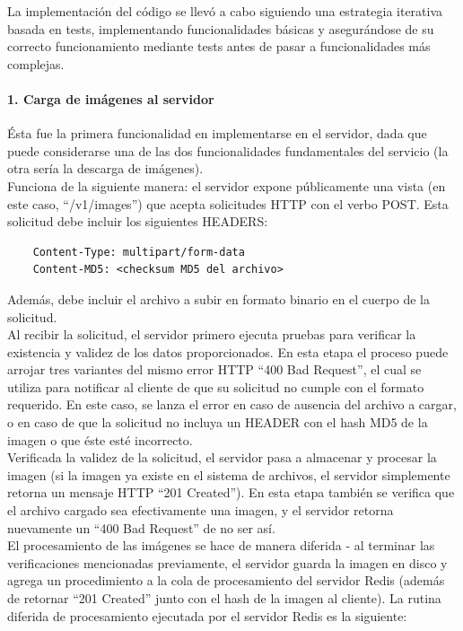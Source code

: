 \documentclass[11pt,letterpaper]{article}
\begin{document}
La implementación del código se llevó a cabo siguiendo una estrategia iterativa basada en tests, implementando funcionalidades básicas y asegurándose de su correcto funcionamiento mediante tests antes de pasar a funcionalidades más complejas.

\paragraph{1. Carga de imágenes al servidor}

Ésta fue la primera funcionalidad en implementarse en el servidor, dada que puede considerarse una de las dos funcionalidades fundamentales del servicio (la otra sería la descarga de imágenes).\\

Funciona de la siguiente manera: el servidor expone públicamente una vista (en este caso, ``/v1/images'') que acepta solicitudes HTTP con el verbo POST. Esta solicitud debe incluir los siguientes HEADERS:
\begin{verbatim}
    Content-Type: multipart/form-data
    Content-MD5: <checksum MD5 del archivo>
\end{verbatim}
Además, debe incluir el archivo a subir en formato binario en el cuerpo de la solicitud. \\

Al recibir la solicitud, el servidor primero ejecuta pruebas para verificar la existencia y validez de los datos proporcionados. En esta etapa el proceso puede arrojar tres variantes del mismo error HTTP ``400 Bad Request'', el cual se utiliza para notificar al cliente de que su solicitud no cumple con el formato requerido. En este caso, se lanza el error en caso de ausencia del archivo a cargar, o en caso de que la solicitud no incluya un HEADER con el hash MD5 de la imagen o que éste esté incorrecto.\\
Verificada la validez de la solicitud, el servidor pasa a almacenar y procesar la imagen (si la imagen ya existe en el sistema de archivos, el servidor simplemente retorna un mensaje HTTP ``201 Created''). En esta etapa también se verifica que el archivo cargado sea efectivamente una imagen, y el servidor retorna nuevamente un ``400 Bad Request'' de no ser así.\\

El procesamiento de las imágenes se hace de manera diferida - al terminar las verificaciones mencionadas previamente, el servidor guarda la imagen en disco y agrega un procedimiento a la cola de procesamiento del servidor Redis (además de retornar ``201 Created'' junto con el hash de la imagen al cliente). La rutina diferida de procesamiento ejecutada por el servidor Redis es la siguiente:
\end{document}
